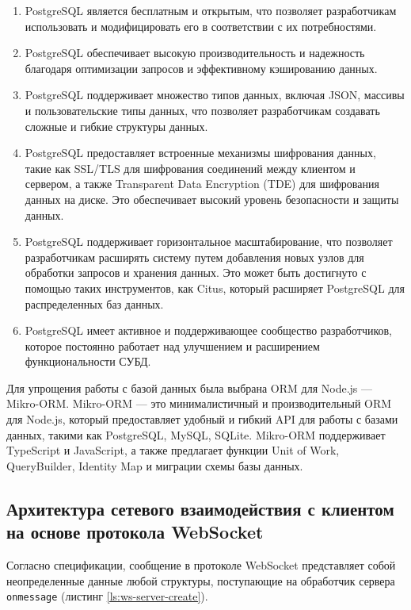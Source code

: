 \begin{enumerate} 
  \item PostgreSQL является бесплатным и открытым, что позволяет разработчикам использовать и модифицировать его в соответствии с их потребностями.
  
  \item PostgreSQL обеспечивает высокую производительность и надежность благодаря оптимизации запросов и эффективному кэшированию данных.

  \item PostgreSQL поддерживает множество типов данных, включая JSON, массивы и пользовательские типы данных, что позволяет разработчикам создавать сложные и гибкие структуры данных.

  \item PostgreSQL предоставляет встроенные механизмы шифрования данных, такие как SSL/TLS для шифрования соединений между клиентом и сервером, а также Transparent Data Encryption (TDE) для шифрования данных на диске. Это обеспечивает высокий уровень безопасности и защиты данных.

  \item PostgreSQL поддерживает горизонтальное масштабирование, что позволяет разработчикам расширять систему путем добавления новых узлов для обработки запросов и хранения данных. Это может быть достигнуто с помощью таких инструментов, как Citus, который расширяет PostgreSQL для распределенных баз данных.

  \item PostgreSQL имеет активное и поддерживающее сообщество разработчиков, которое постоянно работает над улучшением и расширением функциональности СУБД.
\end{enumerate}

Для упрощения работы с базой данных была выбрана ORM для Node.js — Mikro-ORM. Mikro-ORM — это минималистичный и производительный ORM для Node.js, который предоставляет удобный и гибкий API для работы с базами данных, такими как PostgreSQL, MySQL, SQLite. Mikro-ORM поддерживает TypeScript и JavaScript, а также предлагает функции Unit of Work, QueryBuilder, Identity Map и миграции схемы базы данных.

\subsection{Архитектура сетевого взаимодействия с клиентом на основе протокола WebSocket}

Согласно спецификации, сообщение в протоколе WebSocket представляет собой неопределенные данные любой структуры, поступающие на обработчик сервера \verb|onmessage| (листинг \ref{ls:ws-server-create}).

